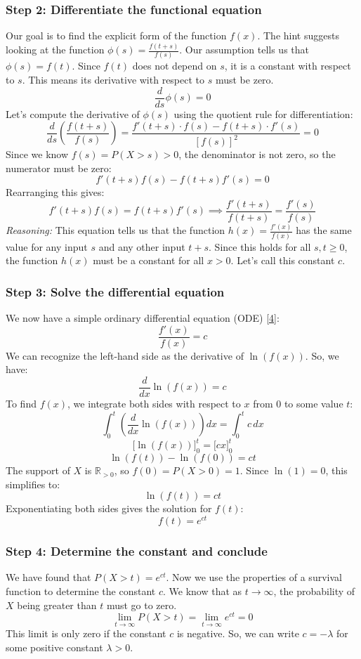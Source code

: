 \documentclass[11pt,a4paper]{article}
\newcommand{\R}{\mathbb{R}} %
\begin{document}
\subsubsection*{Step 2: Differentiate the functional equation}
Our goal is to find the explicit form of the function $f(x)$. The hint suggests looking at the function $\phi(s) = \frac{f(t+s)}{f(s)}$. Our assumption tells us that $\phi(s) = f(t)$. Since $f(t)$ does not depend on $s$, it is a constant with respect to $s$. This means its derivative with respect to $s$ must be zero.
\[ \frac{d}{ds} \phi(s) = 0 \]
Let's compute the derivative of $\phi(s)$ using the quotient rule for differentiation:
\[ \frac{d}{ds} \left( \frac{f(t+s)}{f(s)} \right) = \frac{f'(t+s) \cdot f(s) - f(t+s) \cdot f'(s)}{[f(s)]^2} = 0 \]
Since we know $f(s) = P(X>s) > 0$, the denominator is not zero, so the numerator must be zero:
\[ f'(t+s)f(s) - f(t+s)f'(s) = 0 \]
Rearranging this gives:
\[ f'(t+s)f(s) = f(t+s)f'(s) \implies \frac{f'(t+s)}{f(t+s)} = \frac{f'(s)}{f(s)} \]
\textit{Reasoning:} This equation tells us that the function $h(x) = \frac{f'(x)}{f(x)}$ has the same value for any input $s$ and any other input $t+s$. Since this holds for all $s, t \ge 0$, the function $h(x)$ must be a constant for all $x > 0$. Let's call this constant $c$.

\subsubsection*{Step 3: Solve the differential equation}
We now have a simple ordinary differential equation (ODE) \hyperlink{note:ode}{[4]}:
\[ \frac{f'(x)}{f(x)} = c \]
We can recognize the left-hand side as the derivative of $\ln(f(x))$. So, we have:
\[ \frac{d}{dx} \ln(f(x)) = c \]
To find $f(x)$, we integrate both sides with respect to $x$ from $0$ to some value $t$:
\[ \int_0^t \left( \frac{d}{dx} \ln(f(x)) \right) dx = \int_0^t c \, dx \]
\[ \big[ \ln(f(x)) \big]_0^t = \big[ cx \big]_0^t \]
\[ \ln(f(t)) - \ln(f(0)) = ct \]
The support of $X$ is $\R_{>0}$, so $f(0) = P(X>0) = 1$. Since $\ln(1) = 0$, this simplifies to:
\[ \ln(f(t)) = ct \]
Exponentiating both sides gives the solution for $f(t)$:
\[ f(t) = e^{ct} \]

\subsubsection*{Step 4: Determine the constant and conclude}
We have found that $P(X > t) = e^{ct}$. Now we use the properties of a survival function to determine the constant $c$. We know that as $t \to \infty$, the probability of $X$ being greater than $t$ must go to zero.
\[ \lim_{t \to \infty} P(X > t) = \lim_{t \to \infty} e^{ct} = 0 \]
This limit is only zero if the constant $c$ is negative. So, we can write $c = -\lambda$ for some positive constant $\lambda > 0$.
\end{document}
